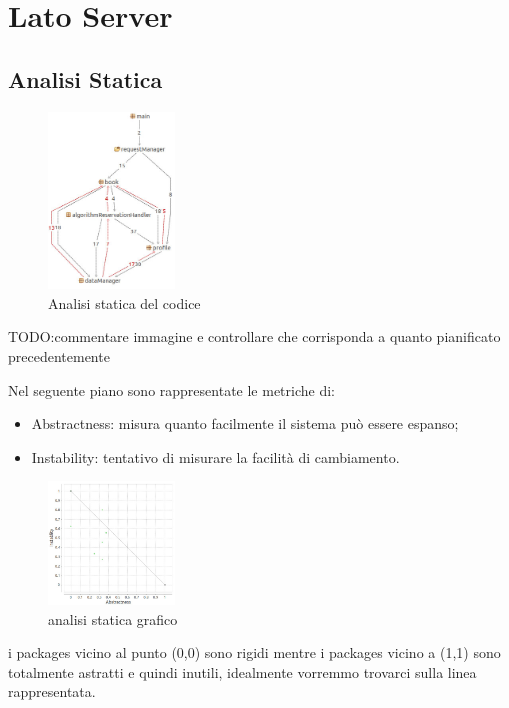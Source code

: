 \section{Lato Server}
	\subsection{Analisi Statica}
		\begin{figure}[h!]
			\centering
			\includegraphics[width=0.3\textwidth]{Immagini/analisi_statica_package.jpg}
			\caption{Analisi statica del codice}
			\label{fig:analisiStatica}
		\end{figure}
		TODO:commentare immagine e controllare che corrisponda a quanto pianificato precedentemente
		
		
		Nel seguente piano sono rappresentate le metriche di:
		\begin{itemize}
			\item Abstractness: misura quanto facilmente il sistema può essere espanso;
			\item Instability: tentativo di misurare la facilità di cambiamento. 
		\end{itemize}
\newpage
	\begin{figure}[h!]
		\centering
		\includegraphics[width=0.3\textwidth]{Immagini/analisi_statica_grafico1.jpg}
		\caption{analisi statica grafico}
		\label{fig:analisiStaticaGrafico}
	\end{figure}		
	i packages vicino al punto (0,0) sono rigidi mentre i packages vicino a (1,1) sono totalmente astratti e quindi inutili, idealmente vorremmo trovarci sulla linea rappresentata.
	
	
	
	
	
	
	
